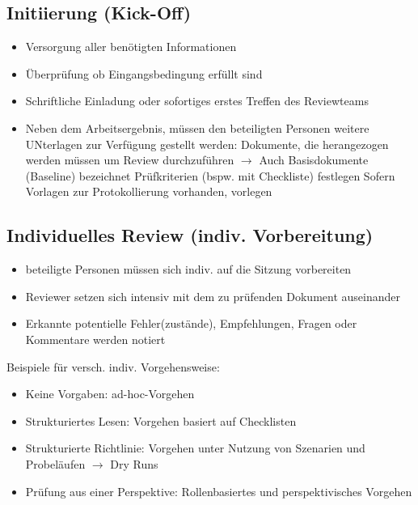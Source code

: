 \documentclass{report}
\theoremstyle{definition}
\theoremstyle{example}
\begin{document}
\subsection{Initiierung (Kick-Off)}
\begin{itemize}
   \item Versorgung aller benötigten Informationen
   \item Überprüfung ob Eingangsbedingung erfüllt sind
   \item Schriftliche Einladung oder sofortiges erstes Treffen des Reviewteams
   \item Neben dem Arbeitsergebnis, müssen den beteiligten Personen weitere UNterlagen zur Verfügung gestellt werden:
   \subitem Dokumente, die herangezogen werden müssen um Review durchzuführen $\rightarrow$ Auch Basisdokumente (Baseline) bezeichnet
   \subitem Prüfkriterien (bspw. mit Checkliste) festlegen
   \subitem Sofern Vorlagen zur Protokollierung vorhanden, vorlegen
\end{itemize}

\subsection{Individuelles Review (indiv. Vorbereitung)}
\begin{itemize}
   \item beteiligte Personen müssen sich indiv. auf die Sitzung vorbereiten
   \item Reviewer setzen sich intensiv mit dem zu prüfenden Dokument auseinander
   \item Erkannte potentielle Fehler(zustände), Empfehlungen, Fragen oder Kommentare werden notiert
\end{itemize}

Beispiele für versch. indiv. Vorgehensweise:
\begin{itemize}
   \item Keine Vorgaben: ad-hoc-Vorgehen
   \item Strukturiertes Lesen: Vorgehen basiert auf Checklisten
   \item Strukturierte Richtlinie: Vorgehen unter Nutzung von Szenarien und Probeläufen $\rightarrow$ Dry Runs
   \item Prüfung aus einer Perspektive: Rollenbasiertes und perspektivisches Vorgehen
\end{itemize}
\end{document}
